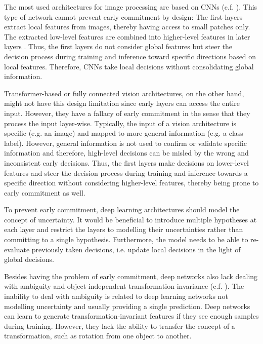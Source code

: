 The most used architectures for image processing are based on CNNs (c.f. ). This type of network cannot prevent early commitment by design: The first layers extract local features from images, thereby having access to small patches only. The extracted low-level features are combined into higher-level features in later layers . Thus, the first layers do not consider global features but steer the decision process during training and inference toward specific directions based on local features. Therefore, CNNs take local decisions without consolidating global information.

Transformer-based  or fully connected  vision architectures, on the other hand, might not have this design limitation since early layers can access the entire input.
However, they have a fallacy of early commitment in the sense that they process the input layer-wise. Typically, the input of a vision architecture is specific (e.g. an image) and mapped to more general information (e.g. a class label).
However, general information is not used to confirm or validate specific information and therefore, high-level decisions can be misled by the wrong and inconsistent early decisions.
Thus, the first layers make decisions on lower-level features and steer the decision process during training and inference towards a specific direction without considering higher-level features, thereby being prone to early commitment as well.

To prevent early commitment, deep learning architectures should model the concept of uncertainty. It would be beneficial to introduce multiple hypotheses at each layer and restrict the layers to modelling their uncertainties rather than committing to a single hypothesis. Furthermore, the model needs to be able to re-evaluate previously taken decisions, i.e. update local decisions in the light of global decisions.

Besides having the problem of early commitment, deep networks also lack dealing with ambiguity and object-independent transformation invariance (c.f. ).
The inability to deal with ambiguity is related to deep learning networks not modelling uncertainty and usually providing a single prediction.
Deep networks can learn to generate transformation-invariant features if they see enough samples during training.
However, they lack the ability to transfer the concept of a transformation, such as rotation from one object to another.

